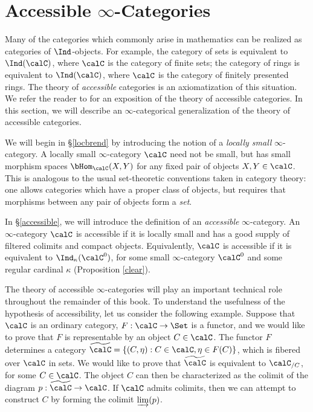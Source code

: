 \section{Accessible $\infty$-Categories}\label{c5s5}

\setcounter{theorem}{0}

Many of the categories which commonly arise in mathematics can be realized as categories of $\Ind$-objects. For example, the category of
sets is equivalent to $\Ind(\calC)$, where $\calC$ is the category of finite sets; the category
of rings is equivalent to $\Ind(\calC)$, where $\calC$ is the category of finitely presented rings.
The theory of {\it accessible} categories is an axiomatization of this situation. We refer the reader to \cite{adamek} for an exposition of the theory of accessible categories. In this section, we will describe an $\infty$-categorical generalization of the theory of accessible categories.

We will begin in \S \ref{locbrend} by introducing the notion of a {\em locally small} $\infty$-category. A locally small $\infty$-category $\calC$ need not be small, but has small morphism spaces
$\bHom_{\calC}(X,Y)$ for any fixed pair of objects $X,Y \in \calC$. This is analogous to the usual set-theoretic conventions taken in category theory: one allows categories which have a proper class of objects, but requires that morphisms between any pair of objects form a {\em set}. 

In \S \ref{accessible}, we will introduce the definition of an {\em accessible} $\infty$-category.
An $\infty$-category $\calC$ is accessible if it is locally small and has a good supply of filtered colimits and compact objects. Equivalently, $\calC$ is accessible if it is equivalent to
$\Ind_{\kappa}(\calC^{0})$, for some small $\infty$-category $\calC^0$ and some regular cardinal $\kappa$ (Proposition \ref{clear}).

The theory of accessible $\infty$-categories will play an important technical role throughout the remainder of this book. To understand the usefulness of the hypothesis of accessibility, let us consider the following example. Suppose that $\calC$ is an ordinary category, $F: \calC \rightarrow \Set$ is a functor, and we would like to prove that $F$ is representable by an object $C \in \calC$. The functor
$F$ determines a category $\widetilde{\calC} = \{ (C, \eta): C \in \calC, \eta \in F(C) \}$, which
is fibered over $\calC$ in sets. We would like to prove that $\widetilde{\calC}$ is equivalent
to $\calC_{/C}$, for some $C \in \calC$. The object $C$ can then be characterized as the colimit
of the diagram $p: \widetilde{\calC} \rightarrow \calC$. If $\calC$ admits colimits, then we can attempt to construct $C$ by forming the colimit $\varinjlim(p)$. 

